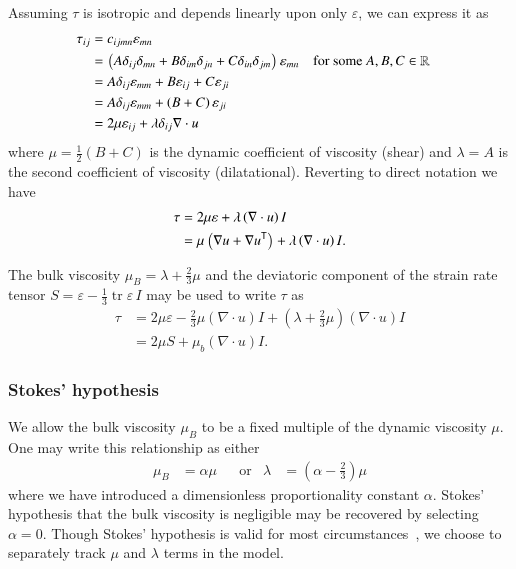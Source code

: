 \documentclass[letterpaper,11pt,nointlimits,reqno]{amsart}
\newcommand{\trans}[1]{{#1}^{\ensuremath{\mathsf{T}}}}
\DeclareMathOperator{\trace}{tr}
\begin{document}
Assuming $\tau$ is isotropic and depends linearly upon only $\varepsilon$,
we can express it as
\begin{align}
\tau_{ij}
&= c_{ijmn} \varepsilon_{mn}
\notag \\
&= \left( A \delta_{ij} \delta_{mn}
        + B \delta_{im} \delta_{jn}
        + C \delta_{in} \delta_{jm}
    \right) \varepsilon_{mn}
&
&\text{for some }A, B, C\in\mathbb{R}
\notag \\
&= A \delta_{ij} \varepsilon_{mm} + B\varepsilon_{ij} + C\varepsilon_{ji}
\notag \\
&= A \delta_{ij} \varepsilon_{mm} + \left( B+C \right)\varepsilon_{ji}
\notag \\
&= 2 \mu \varepsilon_{ij} + \lambda\delta_{ij}\nabla\cdot{}u
\end{align}
where $\mu=\frac{1}{2}\left( B + C \right)$ is the dynamic coefficient of
viscosity (shear) and $\lambda=A$ is the second coefficient of viscosity
(dilatational).  Reverting to direct notation we have
\begin{align}
\tau
&= 2 \mu \varepsilon + \lambda \left( \nabla\cdot{}u \right) I
\notag \\
\label{eq:taunewt}
&=   \mu \left( \nabla{}u + \trans{\nabla{}u} \right)
  + \lambda \left( \nabla\cdot{}u \right) I
.
\end{align}

The bulk viscosity $\mu_{B}=\lambda + \frac{2}{3}\mu$ and the deviatoric
component of the strain rate tensor $S = \varepsilon - \frac{1}{3} \trace
\varepsilon \, I$ may be used to write $\tau$ as
\begin{align}
  \tau
&= 2 \mu \varepsilon - \frac{2}{3}\mu \left(\nabla\cdot{}u\right) I
   + \left(\lambda + \frac{2}{3}\mu\right) \left(\nabla\cdot{}u\right) I
\\
\label{eq:tauSmub}
  &= 2 \mu S + \mu_b  \left( \nabla\cdot{}u \right) I
.
\end{align}

\subsubsection{Stokes' hypothesis}
\label{sec:stokeshypothesis}

We allow the bulk viscosity $\mu_{B}$ to be a fixed multiple of the dynamic
viscosity $\mu$.  One may write this relationship as either
\begin{align}
\label{eq:secondviscosityclaw}
\mu_{B} &= \alpha \mu
&
&\text{or}
&
\lambda &= \left( \alpha - \frac{2}{3} \right) \mu
\end{align}
where we have introduced a dimensionless proportionality constant $\alpha$.
Stokes' hypothesis that the bulk viscosity is negligible may be recovered by
selecting $\alpha = 0$.  Though Stokes' hypothesis is valid for most
circumstances~\cite{GadelHak1995}, we choose to separately track $\mu$ and
$\lambda$ terms in the model.
\end{document}

